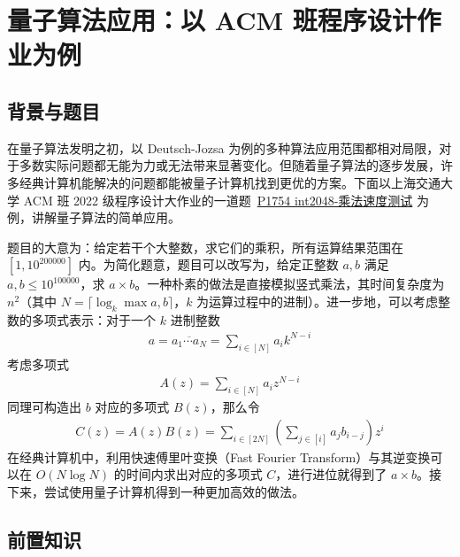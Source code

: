 \section{量子算法应用：以 ACM 班程序设计作业为例}

\subsection{背景与题目}

在量子算法发明之初，以 Deutsch-Jozsa 为例的多种算法应用范围都相对局限，对于多数实际问题都无能为力或无法带来显著变化。但随着量子算法的逐步发展，许多经典计算机能解决的问题都能被量子计算机找到更优的方案。下面以上海交通大学 ACM 班 2022 级程序设计大作业的一道题\ \href{https://acm.sjtu.edu.cn/OnlineJudge/problem?problem_id=1754}{P1754 int2048-乘法速度测试} 为例，讲解量子算法的简单应用。

题目的大意为：给定若干个大整数，求它们的乘积，所有运算结果范围在 $[1,10^{200000}]$ 内。为简化题意，题目可以改写为，给定正整数 $a,b$ 满足 $a,b\le 10^{100000}$，求 $a\times b$。一种朴素的做法是直接模拟竖式乘法，其时间复杂度为 $n^2$（其中 $N=\lceil\log_k\max{a,b}\rceil$，$k$ 为运算过程中的进制）。进一步地，可以考虑整数的多项式表示：对于一个 $k$ 进制整数 \begin{align*}
    a=\overline{a_1\cdots a_N}=\sum_{i\in[N]}a_i k^{N-i}
\end{align*}
考虑多项式 \begin{align*}
    A(z)=\sum_{i\in[N]}a_i z^{N-i}
\end{align*}
同理可构造出 $b$ 对应的多项式 $B(z)$，那么令 \begin{align*}
    C(z)=A(z)B(z)=\sum_{i\in[2N]}\left(\sum_{j\in[i]}a_jb_{i-j}\right)z^i
\end{align*}
在经典计算机中，利用快速傅里叶变换（Fast Fourier Transform）与其逆变换可以在 $O(N\log N)$ 的时间内求出对应的多项式 $C$\cite{cooley1965algorithm}，进行进位就得到了 $a\times b$。接下来，尝试使用量子计算机得到一种更加高效的做法。

\subsection{前置知识}

